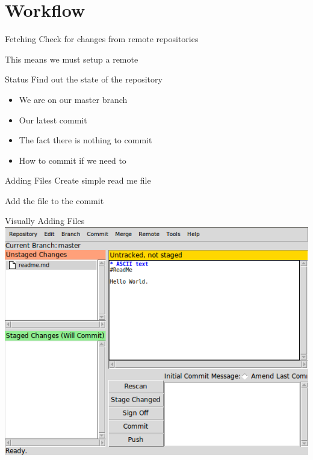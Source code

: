 \documentclass{beamer}
\begin{document}
  \section{Workflow}
  \begin{frame}[fragile=singleslide]{Fetching}
    Check for changes from remote repositories
    
    This means we must setup a remote
    
  \end{frame}
  \begin{frame}[fragile=singleslide]{Status}
    Find out the state of the repository
    
    \begin{itemize}
      \item We are on our master branch
      \item Our latest commit
      \item The fact there is nothing to commit
      \item How to commit if we need to
    \end{itemize}
  \end{frame}
  \begin{frame}[fragile=singleslide]{Adding Files}
    Create simple read me file
    
    
  \end{frame}
  \begin{frame}[fragile=singleslide]
    Add the file to the commit
    
    
  \end{frame}
  \begin{frame}{Visually Adding Files}
    \centering
    \includegraphics[scale=0.4,keepaspectratio]{git-gui.png}
  \end{frame}
\end{document}
